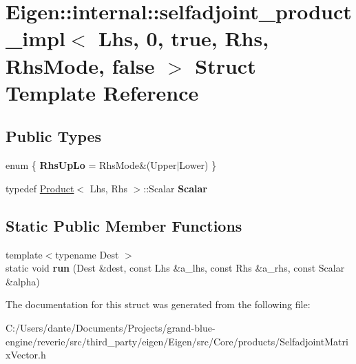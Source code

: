 \hypertarget{struct_eigen_1_1internal_1_1selfadjoint__product__impl_3_01_lhs_00_010_00_01true_00_01_rhs_00_01_rhs_mode_00_01false_01_4}{}\section{Eigen\+::internal\+::selfadjoint\+\_\+product\+\_\+impl$<$ Lhs, 0, true, Rhs, Rhs\+Mode, false $>$ Struct Template Reference}
\label{struct_eigen_1_1internal_1_1selfadjoint__product__impl_3_01_lhs_00_010_00_01true_00_01_rhs_00_01_rhs_mode_00_01false_01_4}
\subsection*{Public Types}
\begin{DoxyCompactItemize}
\item 
\mbox{\label{struct_eigen_1_1internal_1_1selfadjoint__product__impl_3_01_lhs_00_010_00_01true_00_01_rhs_00_01_rhs_mode_00_01false_01_4_aa2a703cb62d3439eae86b258c551af79}} 
enum \{ {\bfseries Rhs\+Up\+Lo} = Rhs\+Mode\&(Upper$\vert$\+Lower)
 \}
\item 
\mbox{\label{struct_eigen_1_1internal_1_1selfadjoint__product__impl_3_01_lhs_00_010_00_01true_00_01_rhs_00_01_rhs_mode_00_01false_01_4_a892de9df7cc9490ebe251092ae68445c}} 
typedef \mbox{\hyperlink{class_eigen_1_1_product}{Product}}$<$ Lhs, Rhs $>$\+::Scalar {\bfseries Scalar}
\end{DoxyCompactItemize}
\subsection*{Static Public Member Functions}
\begin{DoxyCompactItemize}
\item 
\mbox{\label{struct_eigen_1_1internal_1_1selfadjoint__product__impl_3_01_lhs_00_010_00_01true_00_01_rhs_00_01_rhs_mode_00_01false_01_4_a1606839a276bbdc3b514f7a63cab6f81}} 
{\footnotesize template$<$typename Dest $>$ }\\static void {\bfseries run} (Dest \&dest, const Lhs \&a\+\_\+lhs, const Rhs \&a\+\_\+rhs, const Scalar \&alpha)
\end{DoxyCompactItemize}


The documentation for this struct was generated from the following file\+:\begin{DoxyCompactItemize}
\item 
C\+:/\+Users/dante/\+Documents/\+Projects/grand-\/blue-\/engine/reverie/src/third\+\_\+party/eigen/\+Eigen/src/\+Core/products/Selfadjoint\+Matrix\+Vector.\+h\end{DoxyCompactItemize}
